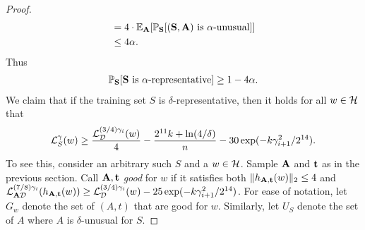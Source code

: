 \begin{proof}
\begin{align*}
&= 4 \cdot \mathbb{E}_{\mathbf{A}}[\mathbb{P}_{\mathbf{S}}[(\mathbf{S},\mathbf{A}) \textrm{ is $\alpha$-unusual}]]\\
&\leq 4 \alpha.
\end{align*}
Thus
\begin{align}
\mathbb{P}_{\mathbf{S}}[\mathbf{S} \textrm{ is $\alpha$-representative}] \geq 1-4 \alpha.\label{eq:oftenrep}
\end{align}
We claim that if the training set $S$ is $\delta$-representative, then it holds for all $w \in \mathcal{H}$ that
\[
\mathcal{L}^\gamma_{S}(w) \geq \frac{\mathcal{L}_{ \mathcal{D}}^{(3/4)\gamma_i}(w)}{4} - \frac{2^{11} k + \ln(4/\delta)}{n} -30 \exp(-k \gamma_{i+1}^2/2^{14}).
\]
To see this, consider an arbitrary such $S$ and a $w \in \mathcal{H}$. Sample $\mathbf{A}$ and $\mathbf{t}$ as in the previous section. Call $\mathbf{A}, \mathbf{t}$ \emph{good} for $w$ if it satisfies both $\|h_{\mathbf{A},\mathbf{t}}(w)\|_2 \leq 4$ and $\mathcal{L}^{(7/8)\gamma_i}_{\mathbf{A} \mathcal{D}}(h_{\mathbf{A},\mathbf{t}}(w)) \geq \mathcal{L}^{(3/4)\gamma_i}_{\mathcal{D}}(w) - 25 \exp(-k \gamma_{i+1}^2/2^{14})$. For ease of notation, let $G_w$ denote the set of $(A,t)$ that are good for $w$. Similarly, let $U_S$ denote the set of $A$ where $A$ is $\delta$-unusual for $S$.


\end{proof}
